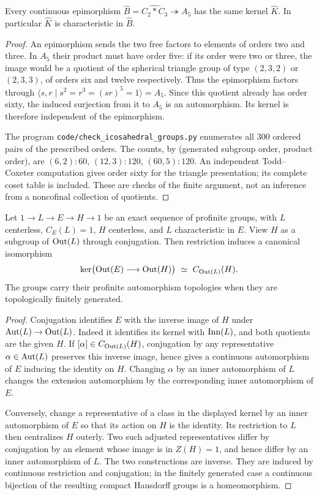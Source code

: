 Every continuous epimorphism
\(\widehat B=\widehat{C_2*C_3}\twoheadrightarrow A_5\) has the same
kernel \(\widehat K\). In particular \(\widehat K\) is characteristic
in \(\widehat B\).
\begin{proof}
An epimorphism sends the two free factors to elements of orders
two and three. In \(A_5\) their product must have order five:
if its order were two or three, the image would be a quotient of
the spherical triangle group of type \((2,3,2)\) or \((2,3,3)\),
of orders six and twelve respectively. Thus the epimorphism factors
through \(\langle s,r\mid s^2=r^3=(sr)^5=1\rangle=A_5\).
Since this quotient already has order sixty, the induced surjection
from it to \(A_5\) is an automorphism. Its kernel is therefore
independent of the epimorphism.

The program \texttt{code/check\_icosahedral\_groups.py} enumerates all
300 ordered pairs of the prescribed orders. The counts, by
(generated subgroup order, product order), are
\((6,2):60\), \((12,3):120\), \((60,5):120\).
An independent Todd--Coxeter computation gives order sixty for
the triangle presentation; its complete coset table is included.
These are checks of the finite argument, not an inference from a
noncofinal collection of quotients.
\end{proof}

Let \(1\to L\to E\to H\to1\) be an exact sequence of profinite groups,
with \(L\) centerless, \(C_E(L)=1\), \(H\) centerless, and \(L\)
characteristic in \(E\). View \(H\) as a subgroup of \(\operatorname{Out}(L)\)
through conjugation. Then restriction induces a canonical isomorphism
\[
 \ker\bigl(\operatorname{Out}(E)\longrightarrow\operatorname{Out}(H)\bigr)
       \ \simeq\ C_{\operatorname{Out}(L)}(H).
\]
The groups carry their profinite automorphism topologies when they are
topologically finitely generated.
\begin{proof}
Conjugation identifies \(E\) with the inverse image of \(H\) under
\(\operatorname{Aut}(L)\to\operatorname{Out}(L)\). Indeed it identifies its kernel with
\(\operatorname{Inn}(L)\), and both quotients are the given \(H\).
If \([\alpha]\in C_{\operatorname{Out}(L)}(H)\), conjugation by any representative
\(\alpha\in\operatorname{Aut}(L)\) preserves this inverse image, hence gives a
continuous automorphism of \(E\) inducing the identity on \(H\).
Changing \(\alpha\) by an inner automorphism of \(L\) changes the
extension automorphism by the corresponding inner automorphism
of \(E\).

Conversely, change a representative of a class in the displayed
kernel by an inner automorphism of \(E\) so that its action on \(H\)
is the identity. Its restriction to \(L\) then centralizes \(H\)
outerly. Two such adjusted representatives differ by conjugation
by an element whose image is in \(Z(H)=1\), and hence differ by an
inner automorphism of \(L\). The two constructions are inverse.
They are induced by continuous restriction and conjugation; in the
finitely generated case a continuous bijection of the resulting
compact Hausdorff groups is a homeomorphism.
\end{proof}

